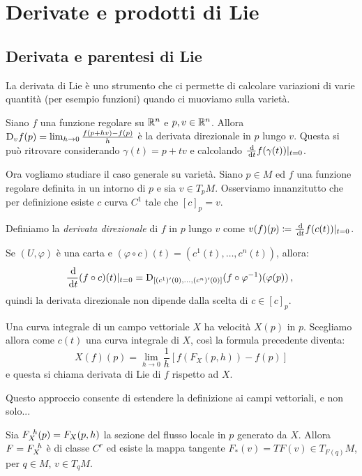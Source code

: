 \chapter{Derivate e prodotti di Lie}

\section{Derivata e parentesi di Lie}
La derivata di Lie è uno strumento che ci permette di calcolare variazioni di varie quantità (per esempio funzioni) quando ci muoviamo sulla varietà.

Siano $f$ una funzione regolare su $\mathbb R^n$ e $p,v\in\mathbb R^n$. Allora $\mathrm D_vf(p)=\lim_{h\to 0} \frac{f(p+hv)-f(p)}h$ è la derivata direzionale in $p$ lungo $v$. Questa si può ritrovare considerando $\gamma(t)=p+tv$ e calcolando $\frac {\,\mathrm d}{\,\mathrm d t} f(\gamma(t))|_{t=0}$.

Ora vogliamo studiare il caso generale su varietà.
Siano $p\in M$ ed $f$ una funzione regolare definita in un intorno di $p$ e sia $v \in T_{p}M$. Osserviamo innanzitutto che per definizione esiste $c$ curva $C^1$ tale che $[c]_p=v$.

\begin{definition} 
	Definiamo la \emph{derivata direzionale} di $f$ in $p$ lungo $v$ come $v(f)(p)\coloneqq\frac {\,\mathrm d} {\,\mathrm d t} f(c(t))|_{t=0}$.
\end{definition}

Se $(U,\varphi)$ è una carta e $(\varphi\circ c)(t)=(c^1(t),\ldots,c^n(t))$, allora:
\begin{equation*}
	\frac {\,\mathrm d}{\,\mathrm d t} (f\circ c)(t)|_{t=0}=\mathrm D_{[(c^1)'(0),\ldots,(c^n)'(0)]}(f\circ\varphi^{-1})(\varphi(p)) \, \text{, }
\end{equation*}
quindi la derivata direzionale non dipende dalla scelta di $c\in[c]_p$.

Una curva integrale di un campo vettoriale $X$ ha velocità $X(p)$ in $p$. Scegliamo allora come $c(t)$ una curva integrale di $X$, così la formula precedente diventa:
\begin{equation*}
	X(f)(p)=\lim_{h\to 0} \frac 1h \left[ f(F_X(p,h))-f(p) \right]
\end{equation*}
e questa si chiama derivata di Lie di $f$ rispetto ad $X$.

Questo approccio consente di estendere la definizione ai campi vettoriali, e non solo...

Sia $F_{X}^{\ h}(p)=F_X(p,h)$ la sezione del flusso locale in $p$ generato da $X$. Allora $F=F_{X}^{\ h}$ è di classe $C^r$ ed esiste la mappa tangente $F_*(v)=TF(v)\in T_{F(q)}M$, per $q\in M$, $v\in T_qM$.

